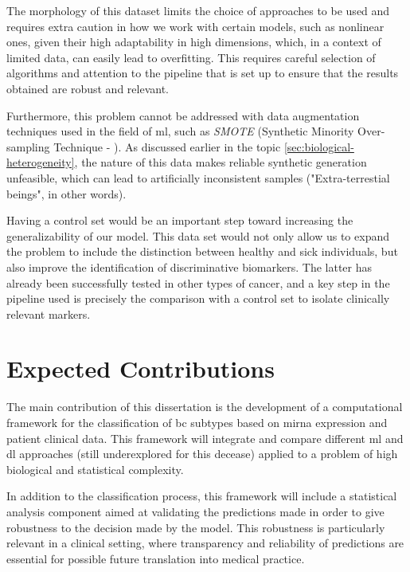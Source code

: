 The morphology of this dataset limits the choice of approaches to be used and
requires extra caution in how we work with certain models, such as nonlinear
ones, given their high adaptability in high dimensions, which, in a context of
limited data, can easily lead to overfitting. This requires careful selection
of algorithms and attention to the pipeline that is set up to ensure that the
results obtained are robust and relevant.

Furthermore, this problem cannot be addressed with data augmentation techniques
used in the field of \gls{ml}, such as \textit{SMOTE} (Synthetic Minority
Over-sampling Technique - \textcite{SMOTE_Blagus2013SMOTE}). As discussed
earlier in the topic \ref{sec:biological-heterogeneity}, the nature of this
data makes reliable synthetic generation unfeasible, which can lead to
artificially inconsistent samples ("Extra-terrestial beings", in other words).

Having a control set would be an important step toward increasing the
generalizability of our model. This data set would not only allow us to expand
the problem to include the distinction between healthy and sick individuals,
but also improve the identification of discriminative biomarkers. The latter
has already been successfully tested in other types of cancer, and a key step
in the pipeline used is precisely the comparison with a control set
\cite{ml_gastric_Azari2023} to isolate clinically relevant markers.

\section{Expected Contributions}
\label{sec:expected-contributions}
The main contribution of this dissertation is the development of a computational
framework for the classification of \gls{bc} subtypes based on \gls{mirna}
expression and patient clinical data. This framework will integrate
and compare different \gls{ml} and \gls{dl} approaches (still underexplored for this decease)
applied to a problem of high biological and statistical complexity.

In addition to the classification process, this framework will include a
statistical analysis component aimed at validating the predictions made in
order to give robustness to the decision made by the model. This robustness is
particularly relevant in a clinical setting, where transparency and reliability
of predictions are essential for possible future translation into medical
practice.

